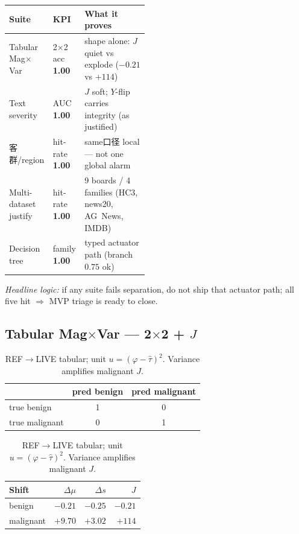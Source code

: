 \documentclass[11pt]{article}
\begin{document}
\begin{center}
\small
\begin{tabular}{@{}llp{0.46\linewidth}@{}}
\toprule
Suite & KPI & What it proves \\
\midrule
Tabular Mag$\times$Var & 2$\times$2 acc \textbf{1.00} &
  shape alone: $J$ quiet vs explode ($-0.21$ vs $+114$) \\
Text severity & AUC \textbf{1.00} &
  $J$ soft; $Y$-flip carries integrity (as justified) \\
客群/region & hit-rate \textbf{1.00} &
  same口径 local --- not one global alarm \\
Multi-dataset justify & hit-rate \textbf{1.00} &
  9 boards / 4 families (HC3, news20, AG~News, IMDB) \\
Decision tree & family \textbf{1.00} &
  typed actuator path (branch $0.75$ ok) \\
\bottomrule
\end{tabular}
\end{center}

\noindent\textit{Headline logic:}
if any suite fails separation, do not ship that actuator path;
all five hit $\Rightarrow$ MVP triage is ready to close.

\subsection{Tabular Mag$\times$Var --- 2$\times$2 + $J$}
\begin{table}[h]
\centering
\caption{REF$\to$LIVE tabular; unit $u=(\varphi-\hat\tau)^2$.
Variance amplifies malignant $J$.}
\label{tab:tab2x2}
\small
\begin{tabular}{@{}lcc@{}}
\toprule
 & pred benign & pred malignant \\
\midrule
true benign & 1 & 0 \\
true malignant & 0 & 1 \\
\bottomrule
\end{tabular}
\qquad
\begin{tabular}{@{}lrrr@{}}
\toprule
Shift & $\Delta\mu$ & $\Delta s$ & $J$ \\
\midrule
benign & $-0.21$ & $-0.25$ & $-0.21$ \\
malignant & $+9.70$ & $+3.02$ & $+114$ \\
\bottomrule
\end{tabular}
\end{table}
\end{document}
